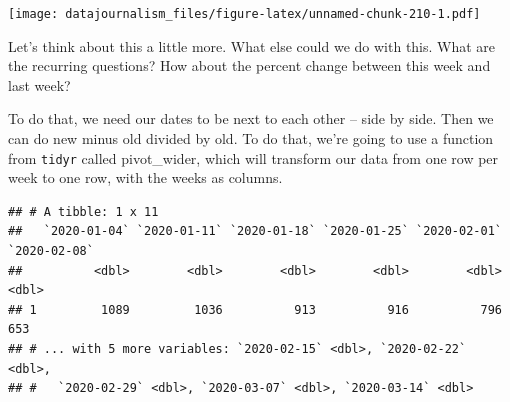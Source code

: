 \documentclass[]{book}
\newenvironment{Shaded}{\begin{snugshade}}{\end{snugshade}}
\newcommand{\DataTypeTok}[1]{\textcolor[rgb]{0.13,0.29,0.53}{#1}}
\newcommand{\DecValTok}[1]{\textcolor[rgb]{0.00,0.00,0.81}{#1}}
\newcommand{\KeywordTok}[1]{\textcolor[rgb]{0.13,0.29,0.53}{\textbf{#1}}}
\newcommand{\NormalTok}[1]{#1}
\newcommand{\OperatorTok}[1]{\textcolor[rgb]{0.81,0.36,0.00}{\textbf{#1}}}
\newcommand{\StringTok}[1]{\textcolor[rgb]{0.31,0.60,0.02}{#1}}
\begin{document}
\begin{Shaded}
\end{Shaded}

\texttt{[image: datajournalism\_files/figure-latex/unnamed-chunk-210-1.pdf]}

Let's think about this a little more. What else could we do with this. What are the recurring questions? How about the percent change between this week and last week?

To do that, we need our dates to be next to each other -- side by side. Then we can do new minus old divided by old. To do that, we're going to use a function from \texttt{tidyr} called pivot\_wider, which will transform our data from one row per week to one row, with the weeks as columns.

\begin{Shaded}
\end{Shaded}

\begin{verbatim}
## # A tibble: 1 x 11
##   `2020-01-04` `2020-01-11` `2020-01-18` `2020-01-25` `2020-02-01` `2020-02-08`
##          <dbl>        <dbl>        <dbl>        <dbl>        <dbl>        <dbl>
## 1         1089         1036          913          916          796          653
## # ... with 5 more variables: `2020-02-15` <dbl>, `2020-02-22` <dbl>,
## #   `2020-02-29` <dbl>, `2020-03-07` <dbl>, `2020-03-14` <dbl>
\end{verbatim}
\end{document}
